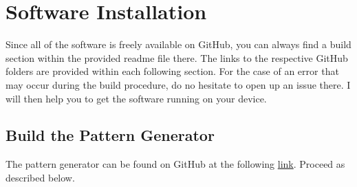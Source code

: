 \chapter{Software Installation}
\label{sec::A_si}
Since all of the software is freely available on GitHub, you can always find a build section within the provided readme file there. The links to the respective GitHub folders are provided within each following section. For the case of an error that may occur during the build procedure, do no hesitate to open up an issue there. I will then help you to get the software running on your device.
\section{Build the Pattern Generator}
\label{sec::A1_pg}
The pattern generator can be found on GitHub at the following \href{https://github.com/mhubii/nmpc_pattern_generator}{link}. Proceed as described below.
